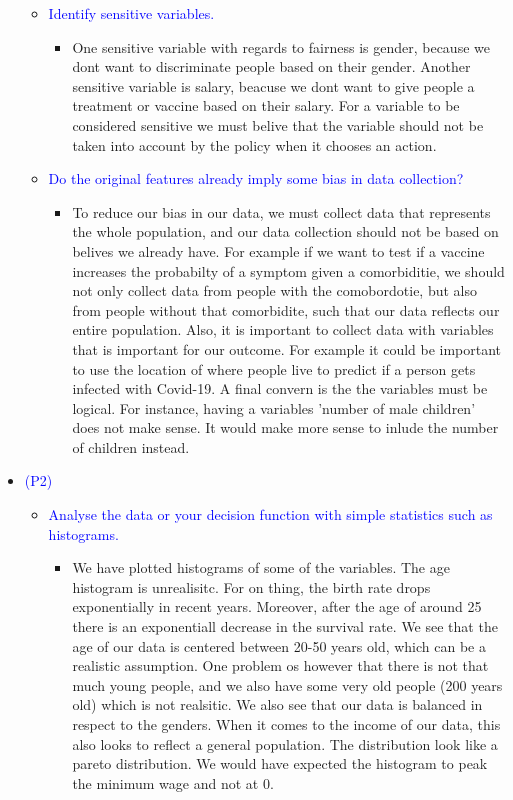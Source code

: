 \begin{itemize}
        \begin{itemize}
            \item \textcolor{blue}{Identify sensitive variables.}
            \begin{itemize}
                \item One sensitive variable with regards to fairness is gender, because we dont want to discriminate people based on their gender. Another sensitive variable is salary, beacuse we dont want to give people a treatment or vaccine based on their salary. For a variable to be considered sensitive we must belive that the variable should not be taken into account by the policy when it chooses an action. 
            \end{itemize}
            \item \textcolor{blue}{Do the original features already imply some bias in data collection?}
            \begin{itemize}
                \item To reduce our bias in our data, we must collect data that represents the whole population, and our data collection should not be based on belives we already have. For example if we want to test if a vaccine increases the probabilty of a symptom given a comorbiditie, we should not only collect data from people with the comobordotie, but also from people without that comorbidite, such that our data reflects our entire population. Also, it is important to collect data with variables that is important for our outcome. For example it could be important to use the location of where people live to predict if a person gets infected with Covid-19. A final convern is the the variables must be logical. For instance, having a variables 'number of male children' does not make sense. It would make more sense to inlude the number of children instead. 
            \end{itemize}
        \end{itemize}
    \item \textcolor{blue}{(P2)}
        \begin{itemize}
            \item \textcolor{blue}{Analyse the data or your decision function with simple statistics such as histograms.}
            \begin{itemize}
                \item We have plotted histograms of some of the variables.
                The age histogram is unrealisitc. For on thing, the birth rate drops exponentially in recent years. Moreover, after the age of around 25 there is an exponentiall decrease in the survival rate. We see that the age of our data is centered between 20-50 years old, which can be a realistic assumption. One problem os however that there is not that much young people, and we also have some very old people (200 years old) which is not realsitic. We also see that our data is balanced in respect to the genders. When it comes to the income of our data, this also looks to reflect a general population. The distribution look like a pareto distribution. We would have expected the histogram to peak the minimum wage and not at 0. 

\end{itemize}
\end{itemize}
\end{itemize}

